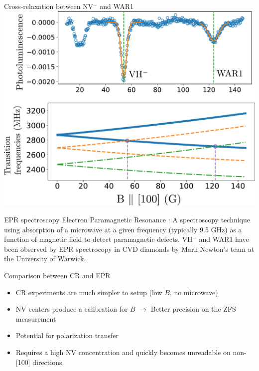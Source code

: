\documentclass{beamer}
\begin{document}
\begin{frame}{Cross-relaxation between NV$^-$ and WAR1}
\includegraphics[scale=.48]{soustraction_2}
\end{frame}
\begin{frame}{EPR spectroscopy}
Electron Paramagnetic Resonance : A spectroscopy technique using absorption of a microwave at a given frequency (typically 9.5 GHz) as a function of magnetic field to detect paramagnetic defects.
\bigbreak
VH$^-$ and WAR1  have been observed by EPR spectrocopy in CVD diamonds by Mark Newton's team at the University of Warwick.
\end{frame}
\begin{frame}{Comparison between CR and EPR}
\begin{itemize}
\item CR experiments are much simpler to setup (low $B$, no microwave)
\item NV centers produce a calibration for $B$ $\to$ Better precision on the ZFS measurement
\item Potential for polarization transfer
\bigbreak
\item Requires a high NV concentration and quickly becomes unreadable on non-[100] directions.
\end{itemize}
\end{frame}
\end{document}

